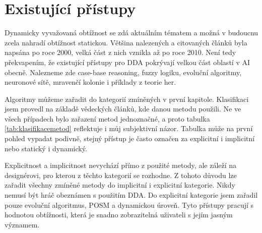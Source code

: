 \chapter{Existující přístupy}

Dynamicky vyvažovaná obtížnost se zdá aktuálním tématem a možná v budoucnu zcela nahradí obtížnost statickou. Většina nalezených a citovaných článků byla napsána po roce 2000, velká část z nich vznikla až po roce 2010. Není tedy překvapením, že existující přístupy pro DDA pokrývají velkou část oblastí v AI obecně. Nalezneme zde case-base reasoning, fuzzy logiku, evoluční algoritmy, neuronové sítě, mravenčí kolonie i příklady z teorie her.

Algoritmy můžeme zařadit do kategorií zmíněných v první kapitole. Klasifikaci jsem provedl na základě vědeckých článků, kde danou metodu použili. Ne ve všech případech bylo zařazení metod jednoznačné, a proto tabulka \ref{tab:klasifikacemetod} reflektuje i můj subjektivní názor. Tabulka může na první pohled vypadat podivně, stejný přístup je často označen za explicitní i implicitní nebo statický i dynamický. 

Explicitnost a implicitnost nevychází přímo z použité metody, ale záleží na designérovi, pro kterou z těchto kategorií se rozhodne. Z tohoto důvodu lze zařadit všechny zmíněné metody do implicitní i explicitní kategorie. Nikdy nemusí být hráč obeznámen s použitím DDA. Do explicitní kategorie jsem zařadil pouze evoluční algoritmus, POSM a dynamickou úroveň. Tyto přístupy pracují s hodnotou obtížnosti, která je snadno zobrazitelná uživateli s jejím jasným významem.


